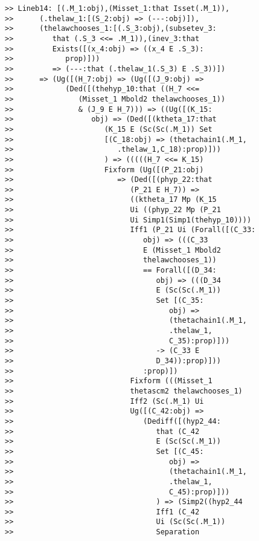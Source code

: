 \documentclass[12pt]{article}
\begin{document}
\begin{verbatim}
>> Lineb14: [(.M_1:obj),(Misset_1:that Isset(.M_1)),
>>      (.thelaw_1:[(S_2:obj) => (---:obj)]),
>>      (thelawchooses_1:[(.S_3:obj),(subsetev_3:
>>         that (.S_3 <<= .M_1)),(inev_3:that
>>         Exists([(x_4:obj) => ((x_4 E .S_3):
>>            prop)]))
>>         => (---:that (.thelaw_1(.S_3) E .S_3))])
>>      => (Ug([(H_7:obj) => (Ug([(J_9:obj) =>
>>            (Ded([(thehyp_10:that ((H_7 <<=
>>               (Misset_1 Mbold2 thelawchooses_1))
>>               & (J_9 E H_7))) => ((Ug([(K_15:
>>                  obj) => (Ded([(ktheta_17:that
>>                     (K_15 E (Sc(Sc(.M_1)) Set
>>                     [(C_18:obj) => (thetachain1(.M_1,
>>                        .thelaw_1,C_18):prop)]))
>>                     ) => (((((H_7 <<= K_15)
>>                     Fixform (Ug([(P_21:obj)
>>                        => (Ded([(phyp_22:that
>>                           (P_21 E H_7)) =>
>>                           ((ktheta_17 Mp (K_15
>>                           Ui ((phyp_22 Mp (P_21
>>                           Ui Simp1(Simp1(thehyp_10))))
>>                           Iff1 (P_21 Ui (Forall([(C_33:
>>                              obj) => (((C_33
>>                              E (Misset_1 Mbold2
>>                              thelawchooses_1))
>>                              == Forall([(D_34:
>>                                 obj) => (((D_34
>>                                 E (Sc(Sc(.M_1))
>>                                 Set [(C_35:
>>                                    obj) =>
>>                                    (thetachain1(.M_1,
>>                                    .thelaw_1,
>>                                    C_35):prop)]))
>>                                 -> (C_33 E
>>                                 D_34)):prop)]))
>>                              :prop)])
>>                           Fixform (((Misset_1
>>                           thetascm2 thelawchooses_1)
>>                           Iff2 (Sc(.M_1) Ui
>>                           Ug([(C_42:obj) =>
>>                              (Dediff([(hyp2_44:
>>                                 that (C_42
>>                                 E (Sc(Sc(.M_1))
>>                                 Set [(C_45:
>>                                    obj) =>
>>                                    (thetachain1(.M_1,
>>                                    .thelaw_1,
>>                                    C_45):prop)]))
>>                                 ) => (Simp2((hyp2_44
>>                                 Iff1 (C_42
>>                                 Ui (Sc(Sc(.M_1))
>>                                 Separation

\end{verbatim}
\end{document}
